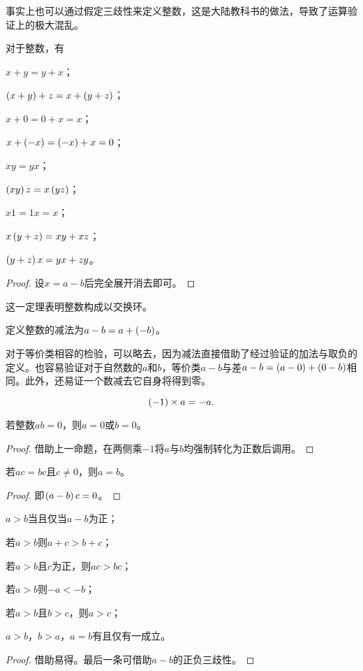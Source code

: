 \documentclass{ctexrep}
\begin{document}
  事实上也可以通过假定三歧性来定义整数，这是大陆教科书的做法，导致了运算验证上的极大混乱。
  \begin{proposition}
    \label{prp:xyyx}
    对于整数，有
    \begin{aenum}
      \item $x+y = y+x$；
      \item $\left(x+y\right)+z = x+\left(y+z\right)$；
      \item $x+0 = 0+x = x$；
      \item $x+\left(-x\right)=\left(-x\right)+x=0$；
      \item $xy=yx$；
      \item $\left(xy\right)z=x\left(yz\right)$；
      \item $x1=1x=x$；
      \item $x\left(y+z\right) = xy + xz$；
      \item $\left(y+z\right)x = yx+zy$。
    \end{aenum}
  \end{proposition}
  \begin{proof}
    设$x=a-b$后完全展开消去即可。
  \end{proof}
  这一定理表明整数构成以交换环。
  \begin{definition}
    定义整数的减法为$a-b=a+\left(-b\right)$。
  \end{definition}
  对于等价类相容的检验，可以略去，因为减法直接借助了经过验证的加法与取负的定义。也容易验证对于自然数的$a$和$b$，等价类$a-b$与差$a-b=\left(a-0\right)+\left(0-b\right)$相同。此外，还易证一个数减去它自身将得到零。
  \begin{proposition}
    \[ \left(-1\right)\times a = -a. \]
  \end{proposition}
  \begin{proposition}
    若整数$ab=0$，则$a=0$或$b=0$。
  \end{proposition}
  \begin{proof}
    借助上一命题，在两侧乘$-1$将$a$与$b$均强制转化为正数后调用。
  \end{proof}
  \begin{collary}
    若$ac=bc$且$c\ne 0$，则$a=b$。
  \end{collary}
  \begin{proof}
    即$\left(a-b\right)c=0$。
  \end{proof}
  \begin{lemma}[整数的序]
    \begin{aenum}
      \item $a>b$当且仅当$a-b$为正；
      \item 若$a>b$则$a+c>b+c$；
      \item 若$a>b$且$c$为正，则$ac>bc$；
      \item 若$a>b$则$-a<-b$；
      \item 若$a>b$且$b>c$，则$a>c$；
      \item $a>b$，$b>a$，$a=b$有且仅有一成立。
    \end{aenum}
  \end{lemma}
  \begin{proof}
    借助易得。最后一条可借助$a-b$的正负三歧性。
  \end{proof}
\end{document}
